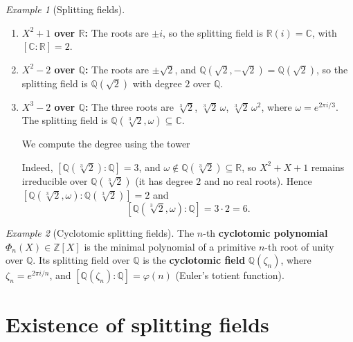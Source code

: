 \documentclass[12pt,a4paper,openany]{book}
\theoremstyle{definition}
\theoremstyle{remark}
\newtheorem{example}{Example}[chapter]
\newcommand{\Z}{\mathbb{Z}}
\newcommand{\Q}{\mathbb{Q}}
\newcommand{\R}{\mathbb{R}}
\newcommand{\C}{\mathbb{C}}
\begin{document}
\begin{example}[Splitting fields]
\label{ex:splitting-fields}
\begin{enumerate}[label=(\roman*)]
  \item \textbf{$X^2 + 1$ over $\R$:} The roots are $\pm i$, so the
    splitting field is $\R(i) = \C$, with $[\C:\R] = 2$.
  \item \textbf{$X^2 - 2$ over $\Q$:} The roots are $\pm\sqrt{2}$,
    and $\Q(\sqrt{2}, -\sqrt{2}) = \Q(\sqrt{2})$, so the splitting
    field is $\Q(\sqrt{2})$ with degree $2$ over $\Q$.
  \item \textbf{$X^3 - 2$ over $\Q$:}\label{ex:splitting-X3-2}
    The three roots are $\sqrt[3]{2}$, $\sqrt[3]{2}\,\omega$,
    $\sqrt[3]{2}\,\omega^2$, where $\omega = e^{2\pi i/3}$. The
    splitting field is
    $\Q(\sqrt[3]{2}, \omega) \subseteq \C$.

    We compute the degree using the tower
    \begin{center}
    \end{center}
    Indeed, $[\Q(\sqrt[3]{2}):\Q] = 3$, and
    $\omega \notin \Q(\sqrt[3]{2}) \subseteq \R$, so $X^2 + X + 1$
    remains irreducible over $\Q(\sqrt[3]{2})$ (it has degree $2$
    and no real roots). Hence
    $[\Q(\sqrt[3]{2},\omega):\Q(\sqrt[3]{2})] = 2$ and
    \[
      [\Q(\sqrt[3]{2}, \omega) : \Q] = 3 \cdot 2 = 6.
    \]
\end{enumerate}
\end{example}

\begin{example}[Cyclotomic splitting fields]
\label{ex:cyclotomic-splitting}
The $n$-th \textbf{cyclotomic polynomial} $\Phi_n(X) \in \Z[X]$ is
the minimal polynomial of a primitive $n$-th root of unity over $\Q$.
Its splitting field over $\Q$ is the \textbf{cyclotomic field}
$\Q(\zeta_n)$, where $\zeta_n = e^{2\pi i/n}$, and
$[\Q(\zeta_n):\Q] = \varphi(n)$ (Euler's totient function).
\end{example}

\section{Existence of splitting fields}
\label{sec:splitting-existence}
\end{document}
